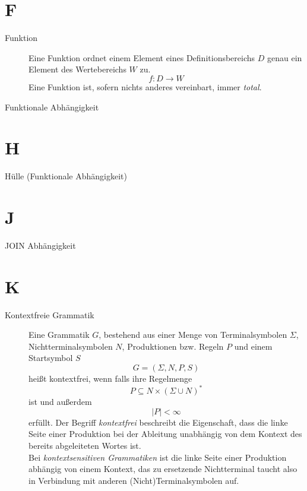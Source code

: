 \section*{F}

\begin{description}
    \item[Funktion] Eine Funktion ordnet einem Element eines Definitionsbereichs $D$ genau ein Element des Wertebereichs $W$ zu.
    \[
        f: D \rightarrow W
    \]
    Eine Funktion ist, sofern nichts anderes vereinbart, immer \textit{total}.
\end{description}


\begin{description}
    \item[Funktionale Abhängigkeit]
\end{description}

\section*{H}

\begin{description}
    \item[Hülle (Funktionale Abhängigkeit)]
\end{description}


\section*{J}

\begin{description}
    \item[JOIN Abhängigkeit]
\end{description}


\section*{K}

\begin{description}
    \item[Kontextfreie Grammatik]
    Eine Grammatik $G$, bestehend aus einer Menge von Terminalsymbolen $\Sigma$, Nichtterminalsymbolen $N$, Produktionen bzw. Regeln $P$ und einem Startsymbol $S$
    \[
        G = (\Sigma, N, P, S)
    \]
    \noindent
    heißt kontextfrei, wenn falls ihre Regelmenge
    \[
        P \subseteq N \times (\Sigma \cup N)^*
    \]
    \noindent
    ist und außerdem
    \[
      \mid P \mid < \infty
    \]
    \noindent
    erfüllt.
    Der Begriff \textit{kontextfrei} beschreibt die Eigenschaft, dass die linke Seite einer Produktion bei der Ableitung unabhängig von dem Kontext des bereits abgeleiteten Wortes ist.\\
    \noindent
    Bei \textit{kontextsensitiven Grammatiken} ist die linke Seite einer Produktion abhängig von einem Kontext, das zu ersetzende Nichtterminal taucht also in Verbindung mit anderen (Nicht)Terminalsymbolen auf.
 \end{description}


